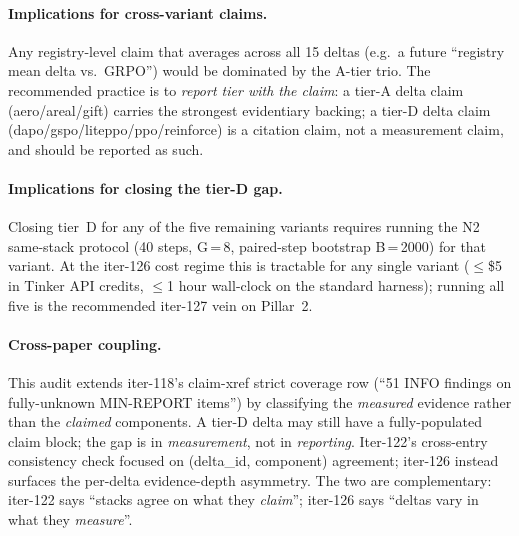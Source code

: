 \documentclass{article}
\begin{document}
\paragraph{Implications for cross-variant claims.}
Any registry-level claim that averages across all 15 deltas
(e.g.\ a future ``registry mean delta vs.\ GRPO'') would be dominated by
the A-tier trio.  The recommended practice is to \emph{report tier with
the claim}: a tier-A delta claim (aero/areal/gift) carries the strongest
evidentiary backing; a tier-D delta claim (dapo/gspo/liteppo/ppo/reinforce)
is a citation claim, not a measurement claim, and should be reported as
such.

\paragraph{Implications for closing the tier-D gap.}
Closing tier~D for any of the five remaining variants requires running
the N2 same-stack protocol (40 steps, G\,=\,8, paired-step bootstrap B\,=\,2000)
for that variant.  At the iter-126 cost regime this is tractable for any
single variant ($\leq$\$5 in Tinker API credits, $\leq$1 hour wall-clock on
the standard harness); running all five is the recommended iter-127 vein
on Pillar~2.

\paragraph{Cross-paper coupling.}
This audit extends iter-118's claim-xref strict coverage row
(``51 INFO findings on fully-unknown MIN-REPORT items'') by classifying
the \emph{measured} evidence rather than the \emph{claimed} components.
A tier-D delta may still have a fully-populated claim block; the gap is
in \emph{measurement}, not in \emph{reporting}.  Iter-122's
cross-entry consistency check focused on (delta\_id, component)
agreement; iter-126 instead surfaces the per-delta evidence-depth
asymmetry.  The two are complementary: iter-122 says ``stacks agree on
what they \emph{claim}''; iter-126 says ``deltas vary in what they
\emph{measure}''.
\end{document}
